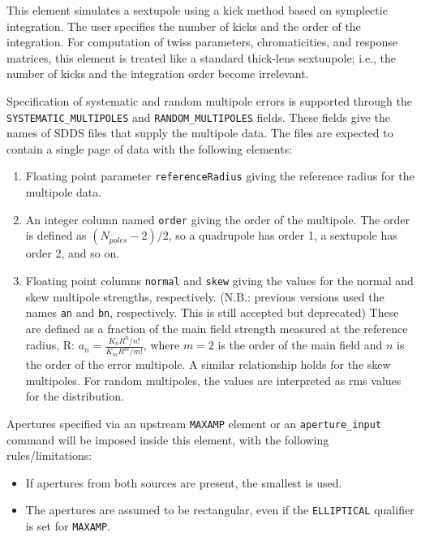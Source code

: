 This element simulates a sextupole using a kick method based on
symplectic integration.  The user specifies the number of kicks and
the order of the integration.  For computation of twiss parameters,
chromaticities, and response matrices, this element is treated like a
standard thick-lens sextuupole; i.e., the number of kicks and the
integration order become irrelevant.

\begin{raggedright}
Specification of systematic and random multipole errors is supported
through the \verb|SYSTEMATIC_MULTIPOLES| and 
\verb|RANDOM_MULTIPOLES|
fields.  These fields give the names of SDDS files that supply the
multipole data.  The files are expected to contain a single page of
data with the following elements:
\end{raggedright}
\begin{enumerate}
\item Floating point parameter {\tt referenceRadius} giving the reference
 radius for the multipole data.
\item An integer column named {\tt order} giving the order of the multipole.
The order is defined as $(N_{poles}-2)/2$, so a quadrupole has order 1, a
sextupole has order 2, and so on.
\item Floating point columns {\tt normal} and {\tt skew} giving the values for the
normal and skew multipole strengths, respectively.  
(N.B.: previous versions used the names {\tt an} and {\tt bn}, respectively. This is still accepted but deprecated)
These are defined as a fraction 
of the main field strength measured at the reference radius, R: 
$a_n  = \frac{K_n R^n / n!}{K_m R^m / m!}$, where 
$m=2$ is the order of the main field and $n$ is the order of the error multipole.
A similar relationship holds for the skew multipoles.
For random multipoles, the values are interpreted as rms values for the distribution.
\end{enumerate}

Apertures specified via an upstream \verb|MAXAMP| element or an \verb|aperture_input|
command will be imposed inside this element, with the following rules/limitations:
\begin{itemize}
\item If apertures from both sources are present, the smallest is used.
\item The apertures are assumed to be rectangular, even if the \verb|ELLIPTICAL| qualifier
 is set for \verb|MAXAMP|.
\end{itemize}
